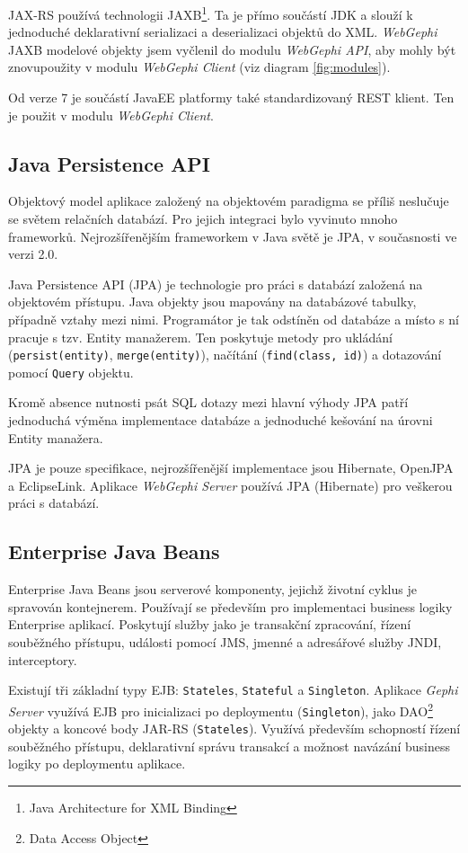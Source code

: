 \documentclass[thesis=M,czech]{FITthesis}[2014/05/6]
\begin{document}
JAX-RS používá technologii JAXB\footnote{Java Architecture for XML Binding\cite{jaxb}}. Ta je přímo součástí JDK a slouží k jednoduché deklarativní serializaci a deserializaci objektů do XML.
\textit{WebGephi} JAXB modelové objekty jsem vyčlenil do modulu \textit{WebGephi API}, aby mohly být znovupoužity v modulu \textit{WebGephi Client} (viz diagram \ref{fig:modules}).

Od verze 7 je součástí JavaEE platformy také standardizovaný REST klient. Ten je použit v modulu \textit{WebGephi Client}.

\subsection{Java Persistence API}
Objektový model aplikace založený na objektovém paradigma se příliš neslučuje se světem relačních databází. Pro jejich integraci
bylo vyvinuto mnoho frameworků. Nejrozšířenějším frameworkem v Java světě je JPA, v současnosti ve verzi 2.0.

Java Persistence API (JPA) je technologie pro práci s databází založená na objektovém přístupu. Java objekty jsou mapovány na databázové tabulky, případně 
vztahy mezi nimi. Programátor je tak odstíněn od databáze a místo s ní pracuje s tzv. Entity manažerem. Ten poskytuje metody pro ukládání (\texttt{persist(entity)}, \texttt{merge(entity)}), 
načítání (\texttt{find(class, id)}) a dotazování pomocí \texttt{Query} objektu.

Kromě absence nutnosti psát SQL dotazy mezi hlavní výhody JPA patří jednoduchá výměna implementace databáze a jednoduché kešování na úrovni Entity manažera.

JPA je pouze specifikace, nejrozšířenější implementace jsou Hibernate, OpenJPA a EclipseLink. Aplikace \textit{WebGephi Server} používá JPA (Hibernate) pro veškerou práci s databází.

\subsection{Enterprise Java Beans\cite{ejb}}
Enterprise Java Beans jsou serverové komponenty, jejichž životní cyklus je spravován kontejnerem. Používají se především pro implementaci business logiky 
Enterprise aplikací. Poskytují služby jako je transakční zpracování, řízení souběžného přístupu, události pomocí JMS, jmenné a adresářové služby JNDI, interceptory.

Existují tři základní typy EJB: \texttt{Stateles}, \texttt{Stateful} a \texttt{Singleton}. Aplikace \textit{Gephi Server}  využívá EJB pro inicializaci 
po deploymentu (\texttt{Singleton}), jako DAO\footnote{Data Access Object} objekty a koncové body JAR-RS (\texttt{Stateles}). Využívá především schopností 
řízení souběžného přístupu, deklarativní správu transakcí a možnost navázání business logiky po deploymentu aplikace. 
\end{document}
